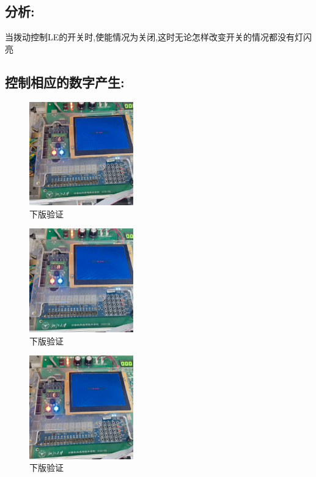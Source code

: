 \documentclass{article}
\begin{document}
\subsection*{分析:}
当拨动控制LE的开关时,使能情况为关闭,这时无论怎样改变开关的情况都没有灯闪亮

\subsection*{控制相应的数字产生:}
    \begin{figure}[H]
	\centering
	\includegraphics[width=0.4\textwidth]{6.jpg}
	\caption{\label{Lab6}下版验证}
	\end{figure}

    \begin{figure}[H]
    \centering
    \includegraphics[width=0.4\textwidth]{7.jpg}
    \caption{\label{Lab6}下版验证}
    \end{figure}

    \begin{figure}[H]
    \centering
    \includegraphics[width=0.4\textwidth]{8.jpg}
    \caption{\label{Lab6}下版验证}
    \end{figure}
\end{document}
